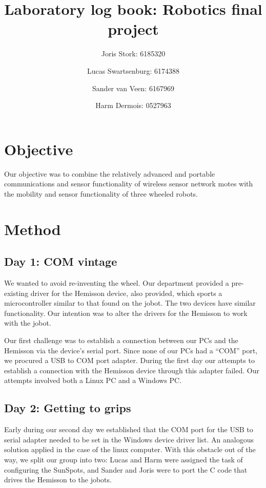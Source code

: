 \documentclass[a4paper, 12pt, titlepage]{article}
\author{Joris Stork: 6185320 \and Lucas Swartsenburg: 6174388 \and Sander van
Veen: 6167969 \and Harm Dermois: 0527963}
\title{Laboratory log book: Robotics final project}
\begin{document}
\maketitle

\section{Objective} %

Our objective was to combine the relatively advanced and portable communications 
and sensor functionality of wireless sensor network motes with the mobility 
and sensor functionality of three wheeled robots.


\section{Method} %


\subsection{Day 1: COM vintage} %

We wanted to avoid re-inventing the wheel. Our department provided a
pre-existing driver for the Hemisson device, also provided, which sports a
microcontroller similar to that found on the jobot. The two devices have similar
functionality. Our intention was to alter the drivers for the Hemisson to work
with the jobot.

Our first challenge was to establish a connection between our PCs and the
Hemisson via the device's serial port. Since none of our PCs had a ``COM'' port,
we procured a USB to COM port adapter. During the first day our attempts to
establish a connection with the Hemisson device through this adapter failed. Our
attempts involved both a Linux PC and a Windows PC.


\subsection{Day 2: Getting to grips} %

Early during our second day we established that the COM port for the USB to
serial adapter needed to be set in the Windows device driver list. An analogous
solution applied in the case of the linux computer. With this obstacle out of
the way, we split our
group into two: Lucas and Harm were assigned the task of configuring the
SunSpots, and Sander and Joris were to port the C code that drives the Hemisson
to the jobots. 
\end{document}
